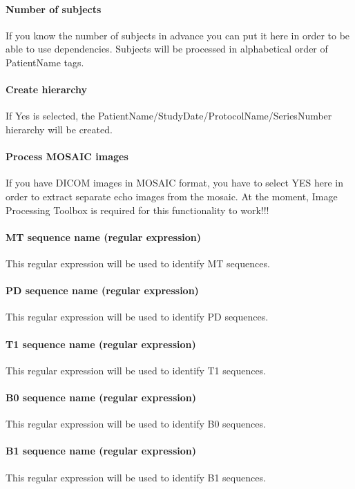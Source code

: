 \paragraph{Number of subjects}
If you know the number of subjects in advance you can put it here in order to be able to use dependencies. Subjects will be processed in alphabetical order of PatientName tags.


\paragraph{Create hierarchy}
If Yes is selected, the PatientName/StudyDate/ProtocolName/SeriesNumber hierarchy will be created.


\paragraph{Process MOSAIC images}
If you have DICOM images in MOSAIC format, you have to select YES here in order to extract separate echo images from the mosaic. At the moment, Image Processing Toolbox is required for this functionality to work!!!


\paragraph{MT sequence name (regular expression)}
This regular expression will be used to identify MT sequences.


\paragraph{PD sequence name (regular expression)}
This regular expression will be used to identify PD sequences.


\paragraph{T1 sequence name (regular expression)}
This regular expression will be used to identify T1 sequences.


\paragraph{B0 sequence name (regular expression)}
This regular expression will be used to identify B0 sequences.


\paragraph{B1 sequence name (regular expression)}
This regular expression will be used to identify B1 sequences.


